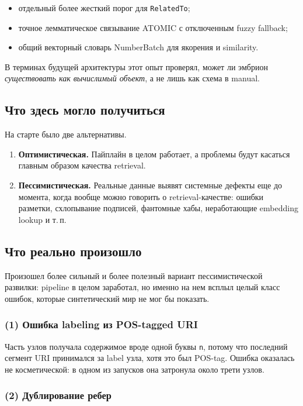 \begin{itemize}[leftmargin=2em]
\item отдельный более жесткий порог для \texttt{RelatedTo};
\item точное лемматическое связывание ATOMIC с отключенным fuzzy fallback;
\item общий векторный словарь NumberBatch для якорения и similarity.
\end{itemize}

В терминах будущей архитектуры этот опыт проверял, может ли эмбрион
\emph{существовать как вычислимый объект}, а не лишь как схема в manual.

\subsection{Что здесь могло получиться}

На старте было две альтернативы.

\begin{enumerate}[leftmargin=2em]
\item \textbf{Оптимистическая.} Пайплайн в целом работает, а проблемы будут
касаться главным образом качества retrieval.
\item \textbf{Пессимистическая.} Реальные данные выявят системные дефекты еще до
момента, когда вообще можно говорить о retrieval-качестве: ошибки разметки,
схлопывание подписей, фантомные хабы, неработающие embedding lookup и т.\,п.
\end{enumerate}

\subsection{Что реально произошло}

Произошел более сильный и более полезный вариант пессимистической развилки:
pipeline в целом заработал, но именно на нем всплыл целый класс ошибок, которые
синтетический мир не мог бы показать.

\subsubsection*{(1) Ошибка labeling из POS-tagged URI}

Часть узлов получала содержимое вроде одной буквы \texttt{n}, потому что
последний сегмент URI принимался за label узла, хотя это был POS-tag. Ошибка
оказалась не косметической: в одном из запусков она затронула около трети узлов.

\subsubsection*{(2) Дублирование ребер}

